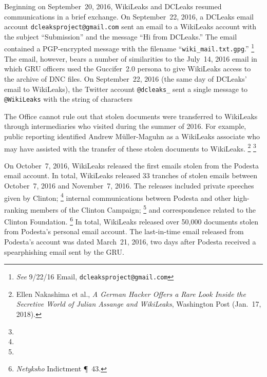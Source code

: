 Beginning on September~20, 2016, WikiLeaks and DCLeaks resumed communications in a brief exchange.
On September~22, 2016, a DCLeaks email account \verb+dcleaksproject@gmail.com+ sent an email to a WikiLeaks account with the subject ``Submission'' and the message ``Hi from DCLeaks.''
The email contained a PGP-encrypted message with the filename ``\verb+wiki_mail.txt.gpg+.''%
\footnote{\textit{See} 9/22/16 Email, \verb+dcleaksproject@gmail.com+ }
The email, however, bears a number of similarities to the July~14, 2016 email in which GRU officers used the Guccifer~2.0 persona to give WikiLeaks access to the archive of DNC files.
On September~22, 2016 (the same day of DCLeaks' email to WikiLeaks), the Twitter account \verb+@dcleaks_+ sent a single message to \verb+@WikiLeaks+ with the string of characters 

The Office cannot rule out that stolen documents were transferred to WikiLeaks through intermediaries who visited during the summer of 2016.
For example, public reporting identified Andrew M{\"u}ller-Maguhn as a WikiLeaks associate who may have assisted with the transfer of these stolen documents to WikiLeaks.%
\footnote{Ellen Nakashima et al., \textit{A German Hacker Offers a Rare Look Inside the Secretive World of Julian Assange and WikiLeaks}, Washington Post (Jan.~17, 2018).}
\footnote{}

On October~7, 2016, WikiLeaks released the first emails stolen from the Podesta email account.
In total, WikiLeaks released 33 tranches of stolen emails between October~7, 2016 and November~7, 2016.
The releases included private speeches given by Clinton;%
\footnote{}
internal communications between Podesta and other high-ranking members of the Clinton Campaign;%
\footnote{}
and correspondence related to the Clinton Foundation.%
\footnote{\textit{Netyksho} Indictment \P~43.}
In total, WikiLeaks released over 50,000 documents stolen from Podesta's  personal email account.
The last-in-time email released from Podesta's account was dated March~21, 2016, two days after Podesta received a spearphishing email sent by the GRU\null.

